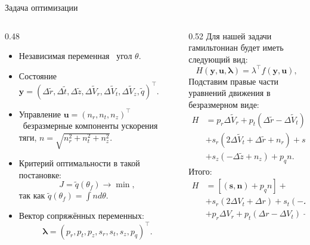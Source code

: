 \documentclass[9pt]{beamer}
\begin{document}
\begin{frame}{Задача оптимизации}
\begin{columns}[T,onlytextwidth]
  \begin{column}{0.48\textwidth}
  \begin{itemize}
      \item Независимая переменная \textemdash\ угол $\theta$.
      \item Состояние $\mathbf{y} = \left( \Delta \tilde r, \Delta \tilde t, \Delta \tilde z, \Delta \tilde V_r, \Delta \tilde V_t, \Delta \tilde V_z, \tilde q \right)^\top$.
      \item Управление $\mathbf{u} = \left( n_r, n_t, n_z \right)^\top$ \textemdash\ безразмерные компоненты ускорения тяги, $n = \sqrt{n_r^2 + n_t^2 + n_z^2}$.
      \item Критерий оптимальности в такой постановке:
      \begin{equation*}
          J = \tilde q (\theta_f) \to \min,
      \end{equation*}
      так как $\tilde q (\theta_f) = \int n d \theta$.
      \item Вектор сопряжённых переменных:
      \begin{equation*}
          \mathbf{\lambda} = \left( p_r, p_t, p_z, s_r, s_t, s_z, p_q \right)^\top.
      \end{equation*}
  \end{itemize}
  \end{column}

  \begin{column}{0.52\textwidth}
    Для нашей задачи гамильтониан будет иметь следующий вид:
    \begin{equation*}
        H (\mathbf{y}, \mathbf{u}, \mathbf{\lambda}) = \lambda^\top f(\mathbf{y}, \mathbf{u}),
    \end{equation*}
    Подставим правые части уравнений движения в безразмерном виде:
    \begin{align*}
        H &= p_r \Delta \tilde V_r + p_t \left( \Delta \tilde r - \Delta \tilde V_t \right) + p_z \Delta \tilde V_z + \\
        &+ s_r \left( 2\Delta \tilde V_t + \Delta \tilde r + n_r \right) + s_t \left( -\Delta \tilde V_r + n_t \right) + \\
        &+ s_z \left( -\Delta \tilde z + n_z \right) + p_q n.
    \end{align*}
    Итого:
    \begin{equation*}
    \boxed{
        \begin{aligned}
            H &= \left[ (\mathbf{s}, \mathbf{n}) + p_q n \right] + \\
            &+ s_r \left( 2\Delta V_t + \Delta r\right) + s_t \left( -\Delta V_r \right) + s_z \left( -\Delta z \right) + \\
            &+ p_r \Delta V_r + p_t \left( \Delta r - \Delta V_t \right) + p_z \Delta V_z
        \end{aligned}
    }
    \end{equation*}
  \end{column}
\end{columns}
\end{frame}
\end{document}
